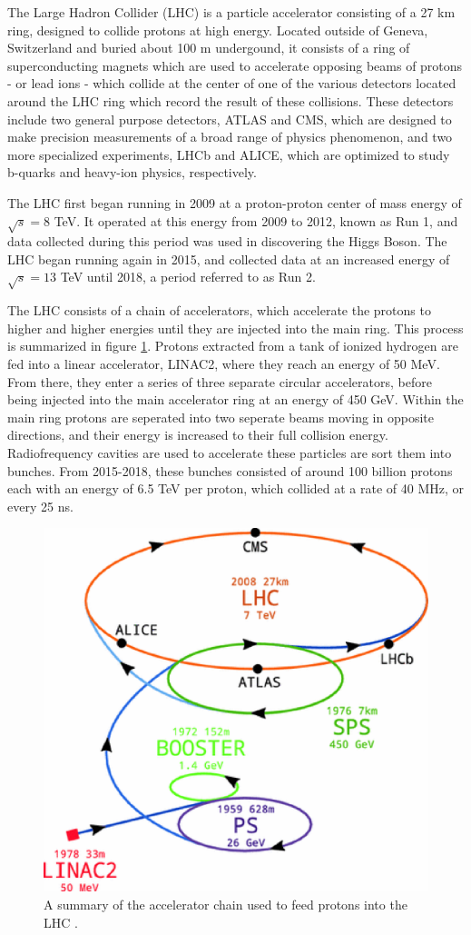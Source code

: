 The Large Hadron Collider (LHC) is a particle accelerator consisting of a 27 km ring, designed to collide protons at high energy. Located outside of Geneva, Switzerland and buried about 100 m undergound, it consists of a ring of superconducting magnets which are used to accelerate opposing beams of protons - or lead ions - which collide at the center of one of the various detectors located around the LHC ring which record the result of these collisions. These detectors include two general purpose detectors, ATLAS and CMS, which are designed to make precision measurements of a broad range of physics phenomenon, and two more specialized experiments, LHCb and ALICE, which are optimized to study b-quarks and heavy-ion physics, respectively.

The LHC first began running in 2009 at a proton-proton center of mass energy of $\sqrt{s} = 8$ TeV. It operated at this energy from 2009 to 2012, known as Run 1, and data collected during this period was used in discovering the Higgs Boson. The LHC began running again in 2015, and collected data at an increased energy of $\sqrt{s} = 13$ TeV until 2018, a period referred to as Run 2. 

The LHC consists of a chain of accelerators, which accelerate the protons to higher and higher energies until they are injected into the main ring. This process is summarized in figure \ref{fig:AccChain}. Protons extracted from a tank of ionized hydrogen are fed into a linear accelerator, LINAC2, where they reach an energy of 50 MeV. From there, they enter a series of three separate circular accelerators, before being injected into the main accelerator ring at an energy of 450 GeV. Within the main ring protons are seperated into two seperate beams moving in opposite directions, and their energy is increased to their full collision energy. Radiofrequency cavities are used to accelerate these particles are sort them into bunches. From 2015-2018, these bunches consisted of around 100 billion protons each with an energy of 6.5 TeV per proton, which collided at a rate of 40 MHz, or every 25 ns. 

\begin{figure}[H]
\centering
   \includegraphics[width=0.75\linewidth]{figures/lhc/AccChain.eps}
\caption{A summary of the accelerator chain used to feed protons into the LHC \cite{}.}
\label{fig:AccChain}
\end{figure}

